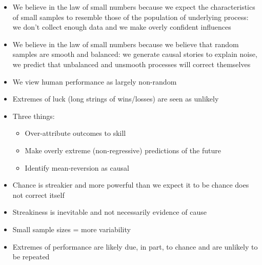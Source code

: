 \documentclass[12pt]{article}
\begin{document}
\begin{itemize}
\item We believe in the law of small numbers because we expect the characteristics of small samples to resemble those of the population of underlying process: we don't collect enough data and we make overly confident influences 
\item We believe in the law of small numbers because we believe that random samples are smooth and balanced: we generate causal stories to explain noise, we predict that unbalanced and unsmooth processes will correct themselves 
\item We view human performance as largely non-random 
\item Extremes of luck (long strings of wins/losses) are seen as unlikely
\item Three things: \begin{itemize} 
\item Over-attribute outcomes to skill 
\item Make overly extreme (non-regressive) predictions of the future
\item Identify mean-reversion as causal \end{itemize} 
\item Chance is streakier and more powerful than we expect it to be chance does not correct itself 
\item Streakiness is inevitable and not necessarily evidence of cause 
\item Small sample sizes = more variability 
\item Extremes of performance are likely due, in part, to chance and are unlikely to be repeated 
\end{itemize}
\newpage
\end{document}
